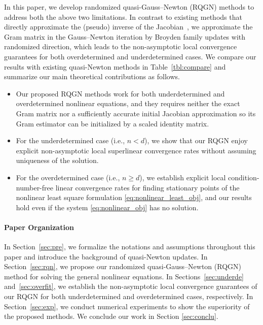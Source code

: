 \documentclass[11pt]{article}
\theoremstyle{plain}
\theoremstyle{definition}
\theoremstyle{remark}
\theoremstyle{plain}
\begin{document}
In this paper, we develop randomized quasi-Gauss–Newton (RQGN) methods to address both the above two limitations.
In contrast to existing methods that directly approximate the (pseudo) inverse of the Jacobian~\citep{lin2021explicit,ye2021greedy,liu2023block,martinez1991quasi,vater2024convergence},
we approximate the Gram matrix in the Gauss--Newton iteration by Broyden family updates with randomized direction,
which leads to the non-asymptotic local convergence guarantees for both overdetermined and underdetermined cases.
We compare our results with existing quasi-Newton methods in Table~\ref{tbl:compare} and summarize our main theoretical contributions as follows.
\begin{itemize}[topsep=0.08cm,itemsep=0.08cm]
\item Our proposed RQGN methods work for both underdetermined and overdetermined nonlinear equations, and they requires neither the exact Gram matrix nor a sufficiently accurate initial Jacobian approximation so its Gram estimator can be initialized by a scaled identity matrix.
\item For the underdetermined case (i.e., $n<d$), we show that our RQGN enjoy explicit non-asymptotic local superlinear convergence rates without assuming uniqueness of the solution.
\item For the overdetermined case (i.e., $n\geq d$), we establish explicit local condition-number-free linear convergence rates for finding stationary points of the nonlinear least square formulation \eqref{eq:nonlinear_least_obj}, and our results hold even if the system \eqref{eq:nonlinear_obj} has no solution.
\end{itemize}

\paragraph{Paper Organization}
In Section~\ref{sec:pre}, we formalize the notations and assumptions throughout this paper and introduce the background of quasi-Newton updates. 
In Section~\ref{sec:rqn}, we propose our randomized quasi-Gauss--Newton (RQGN) method for solving the general nonlinear equations.
In Sections~\ref{sec:underde} and~\ref{sec:overfit}, we establish the non-asymptotic local convergence guarantees of our RQGN for both underdetermined and overdetermined cases, respectively.
In Section~\ref{sec:exp}, we conduct numerical experiments to show the superiority of the proposed methods.
We conclude our work in Section \ref{sec:conclu}.
\end{document}
